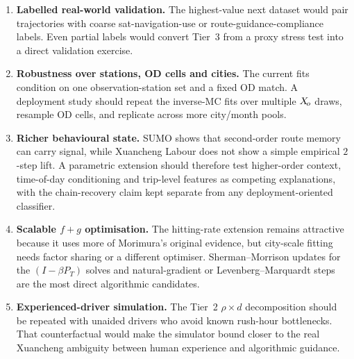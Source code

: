 \begin{enumerate}
\item \textbf{Labelled real-world validation.} The highest-value next
dataset would pair trajectories with coarse sat-navigation-use or
route-guidance-compliance labels. Even partial labels would convert
Tier~3 from a proxy stress test into a direct validation exercise.

\item \textbf{Robustness over stations, OD cells and cities.} The current
fits condition on one observation-station set and a fixed OD match. A
deployment study should repeat the inverse-MC fits over multiple $X_{\!o}$
draws, resample OD cells, and replicate across more city/month pools.

\item \textbf{Richer behavioural state.} SUMO shows that second-order
route memory can carry signal, while Xuancheng Labour does not show a
simple empirical $2$-step lift. A parametric extension should therefore
test higher-order context, time-of-day conditioning and trip-level
features as competing explanations, with the chain-recovery claim kept
separate from any deployment-oriented classifier.

\item \textbf{Scalable $f+g$ optimisation.} The hitting-rate extension
remains attractive because it uses more of Morimura's original evidence,
but city-scale fitting needs factor sharing or a different optimiser.
Sherman--Morrison updates for the $(I-\beta P_T)$ solves and
natural-gradient or Levenberg--Marquardt steps are the most direct
algorithmic candidates.

\item \textbf{Experienced-driver simulation.} The Tier~2
$\rho \times d$ decomposition should be repeated with unaided drivers who
avoid known rush-hour bottlenecks. That counterfactual would make the
simulator bound closer to the real Xuancheng ambiguity between human
experience and algorithmic guidance.
\end{enumerate}
